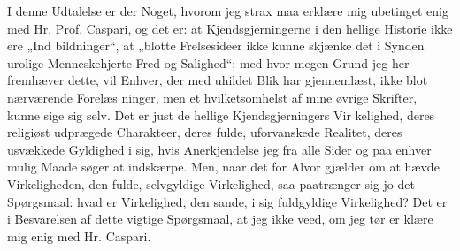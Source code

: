 \documentclass[12pt]{book}
\begin{document}
I denne Udtalelse er der Noget, hvorom jeg strax maa
erklære mig ubetinget enig med Hr. Prof. Caspari, og det er:
at Kjendsgjerningerne i den hellige Historie ikke ere „Ind\-%
bildninger“, at „blotte Frelsesideer ikke kunne skjænke det i
Synden urolige Menneskehjerte Fred og Salighed“; med hvor\-%
megen Grund jeg her fremhæver dette, vil Enhver, der med
uhildet Blik har gjennemlæst, ikke blot nærværende Forelæs\-%
ninger, men et hvilketsomhelst af mine øvrige Skrifter, kunne
sige sig selv. Det er just de hellige Kjendsgjerningers Vir\-%
kelighed, deres religiøst udprægede Charakteer, deres fulde,
uforvanskede Realitet, deres usvækkede Gyldighed i sig, hvis
Anerkjendelse jeg fra alle Sider og paa enhver mulig Maade
søger at indskærpe. Men, naar det for Alvor gjælder om
at hævde Virkeligheden, den fulde, selvgyldige Virkelighed,
saa paatrænger sig jo det Spørgsmaal: hvad er Virkelighed,
den sande, i sig fuldgyldige Virkelighed? Det er i Besvarelsen
af dette vigtige Spørgsmaal, at jeg ikke veed, om jeg tør er\-%
klære mig enig med Hr. Caspari.
\end{document}
